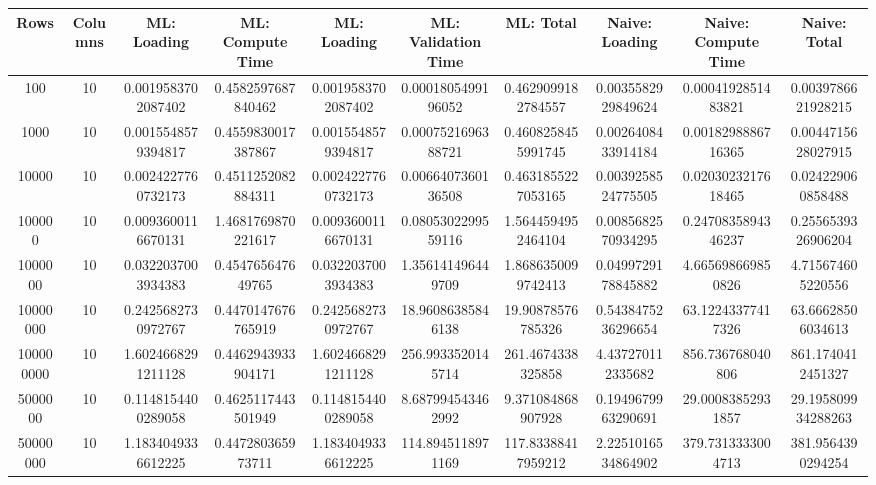 \begin{table}[htb]
    \centering
    \begin{tabular}{@{}cccccccccc@{}}
        \toprule
        Rows & Columns & ML: Loading & ML: Compute Time & ML: Loading & ML: Validation Time & ML: Total & Naive: Loading & Naive: Compute Time & Naive: Total \\
        \midrule
        100 & 10 & 0.0019583702087402 & 0.4582597687840462 & 0.0019583702087402 & 0.0001805499196052 & 0.4629099182784557 & 0.0035582929849624 & 0.0004192851483821 & 0.0039786621928215 \\
        1000 & 10 & 0.0015548579394817 & 0.4559830017387867 & 0.0015548579394817 & 0.0007521696388721 & 0.4608258455991745 & 0.0026408433914184 & 0.0018298886716365 & 0.0044715628027915 \\
        10000 & 10 & 0.0024227760732173 & 0.4511252082884311 & 0.0024227760732173 & 0.0066407360136508 & 0.4631855227053165 & 0.0039258524775505 & 0.0203023217618465 & 0.024229060858488 \\
        100000 & 10 & 0.0093600116670131 & 1.4681769870221617 & 0.0093600116670131 & 0.0805302299559116 & 1.5644594952464104 & 0.0085682570934295 & 0.2470835894346237 & 0.2556539326906204 \\
        1000000 & 10 & 0.0322037003934383 & 0.454765647649765 & 0.0322037003934383 & 1.356141496449709 & 1.8686350099742413 & 0.0499729178845882 & 4.665698669850826 & 4.715674605220556 \\
        10000000 & 10 & 0.2425682730972767 & 0.4470147676765919 & 0.2425682730972767 & 18.96086385846138 & 19.90878576785326 & 0.5438475236296654 & 63.12243377417326 & 63.66628506034613 \\
        100000000 & 10 & 1.6024668291211128 & 0.4462943933904171 & 1.6024668291211128 & 256.9933520145714 & 261.4674338325858 & 4.437270112335682 & 856.736768040806 & 861.1740412451327 \\
        5000000 & 10 & 0.1148154400289058 & 0.4625117443501949 & 0.1148154400289058 & 8.687994543462992 & 9.371084868907928 & 0.1949679963290691 & 29.00083852931857 & 29.195809934288263 \\
        50000000 & 10 & 1.1834049336612225 & 0.447280365973711 & 1.1834049336612225 & 114.8945118971169 & 117.83388417959212 & 2.2251016534864902 & 379.7313333004713 & 381.9564390294254 \\
        \bottomrule
    \end{tabular}
\end{table}